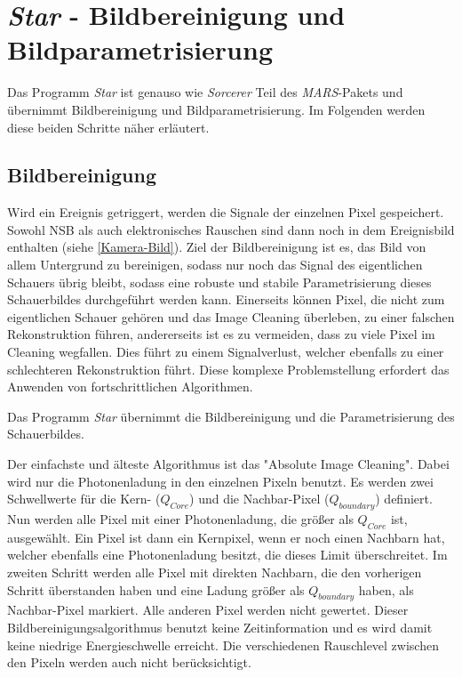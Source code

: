 \section{\textit{Star} - Bildbereinigung und Bildparametrisierung}
\label{sec:Star-ImageCleaning}
Das Programm \textit{Star} ist genauso wie \textit{Sorcerer} Teil des \textit{MARS}-Pakets und übernimmt Bildbereinigung und Bildparametrisierung.
Im Folgenden werden diese beiden Schritte näher erläutert.


\subsection{Bildbereinigung}

Wird ein Ereignis getriggert, werden die Signale der einzelnen Pixel gespeichert.
Sowohl NSB als auch elektronisches Rauschen sind dann noch in dem Ereignisbild enthalten (siehe \autoref{Kamera-Bild}).
Ziel der Bildbereinigung ist es, das Bild von allem Untergrund zu bereinigen, sodass nur noch das Signal des eigentlichen Schauers übrig bleibt, sodass eine robuste und stabile Parametrisierung dieses Schauerbildes durchgeführt werden kann.
Einerseits können Pixel, die nicht zum eigentlichen Schauer gehören und das Image Cleaning überleben, zu einer falschen Rekonstruktion führen, andererseits ist es zu vermeiden, dass zu viele Pixel im Cleaning wegfallen. 
Dies führt zu einem Signalverlust, welcher ebenfalls zu einer schlechteren Rekonstruktion führt.
Diese komplexe Problemstellung erfordert das Anwenden von fortschrittlichen Algorithmen.

Das Programm \textit{Star} übernimmt die Bildbereinigung und die Parametrisierung des Schauerbildes.

Der einfachste und älteste Algorithmus ist das "Absolute Image Cleaning".
Dabei wird nur die Photonenladung in den einzelnen Pixeln benutzt.
Es werden zwei Schwellwerte für die Kern- ($Q_{Core}$) und die Nachbar-Pixel ($Q_{boundary}$) definiert.
Nun werden alle Pixel mit einer Photonenladung, die größer als $Q_{Core}$ ist, ausgewählt.
Ein Pixel ist dann ein Kernpixel, wenn er noch einen Nachbarn hat, welcher ebenfalls eine Photonenladung besitzt, die dieses Limit überschreitet.
Im zweiten Schritt werden alle Pixel mit direkten Nachbarn, die den vorherigen Schritt überstanden haben und eine Ladung größer als $Q_{boundary}$ haben, als Nachbar-Pixel markiert.
Alle anderen Pixel werden nicht gewertet.
Dieser Bildbereinigungsalgorithmus benutzt keine Zeitinformation und es wird damit keine niedrige Energieschwelle erreicht. 
Die verschiedenen Rauschlevel zwischen den Pixeln werden auch nicht berücksichtigt.

